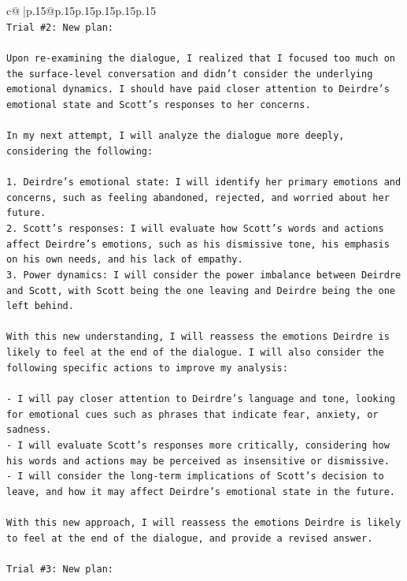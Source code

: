 \documentclass{article}
\begin{document}
{\begin{supertabular}{c@{$\;$}|p{.15\linewidth}@{}p{.15\linewidth}p{.15\linewidth}p{.15\linewidth}p{.15\linewidth}p{.15\linewidth}}
{{{\\ 
\texttt{Trial \#2: New plan: } \\
\\ 
\texttt{Upon re{-}examining the dialogue, I realized that I focused too much on the surface{-}level conversation and didn't consider the underlying emotional dynamics. I should have paid closer attention to Deirdre's emotional state and Scott's responses to her concerns. } \\
\\ 
\texttt{In my next attempt, I will analyze the dialogue more deeply, considering the following:} \\
\\ 
\texttt{1. Deirdre's emotional state: I will identify her primary emotions and concerns, such as feeling abandoned, rejected, and worried about her future.} \\
\texttt{2. Scott's responses: I will evaluate how Scott's words and actions affect Deirdre's emotions, such as his dismissive tone, his emphasis on his own needs, and his lack of empathy.} \\
\texttt{3. Power dynamics: I will consider the power imbalance between Deirdre and Scott, with Scott being the one leaving and Deirdre being the one left behind.} \\
\\ 
\texttt{With this new understanding, I will reassess the emotions Deirdre is likely to feel at the end of the dialogue. I will also consider the following specific actions to improve my analysis:} \\
\\ 
\texttt{{-} I will pay closer attention to Deirdre's language and tone, looking for emotional cues such as phrases that indicate fear, anxiety, or sadness.} \\
\texttt{{-} I will evaluate Scott's responses more critically, considering how his words and actions may be perceived as insensitive or dismissive.} \\
\texttt{{-} I will consider the long{-}term implications of Scott's decision to leave, and how it may affect Deirdre's emotional state in the future.} \\
\\ 
\texttt{With this new approach, I will reassess the emotions Deirdre is likely to feel at the end of the dialogue, and provide a revised answer.} \\
\\ 
\texttt{Trial \#3: New plan: } \\
}}}
\end{supertabular}}
\end{document}

